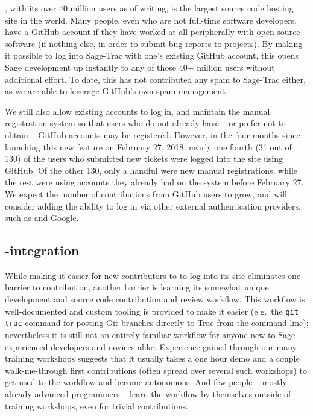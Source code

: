 \GitHub, with its over 40 million users as of writing, is the largest source
code hosting site in the world.  Many people, even who are not full-time
software developers, have a GitHub account if they have worked at all
peripherally with open source software (if nothing else, in order to submit bug
reports to projects).  By making it possible to log into Sage-Trac with one's
existing GitHub account, this opens Sage development up instantly to any of
those 40+ million users without additional effort.  To date, this has not
contributed any spam to Sage-Trac either, as we are able to leverage GitHub's
own spam management.

We still also allow existing accounts to log in, and maintain the manual
registration system so that users who do not already have -- or prefer not to
obtain -- GitHub accounts may be registered.  However, in the four months since
launching this new feature on February 27, 2018, nearly one fourth (31 out of
130) of the users who submitted new tickets were logged into the site using
GitHub.  Of the other 130, only a handful were new manual registrations, while
the rest were using accounts they already had on the system before February 27.
We expect the number of contributions from GitHub users to grow, and will
consider adding the ability to log in via other external authentication
providers, such as \GitLab and Google.


\hypertarget{gitlab-trac-integration}{%
\subsection{\GitLab-\Trac integration}\label{gitlab-trac-integration}}

While making it easier for new contributors to \Sage to log into its \Trac site
eliminates one barrier to contribution, another barrier is learning its
somewhat unique development and source code contribution and review workflow.
This workflow is well-documented and custom tooling is provided to make it
easier (e.g.~the {\tt git trac} command for posting Git branches directly to
Trac from the command line); nevertheless it is still not an entirely familiar
workflow for anyone new to Sage--experienced developers and novices alike.
%
Experience gained through our many training workshops suggests that it usually
takes a one hour demo and a couple walk-me-through first contributions (often
spread over several such workshops) to get used to the workflow and become
autonomous. And few people -- mostly already advanced programmers -- learn the
workflow by themselves outside of training workshops, even for trivial
contributions.

